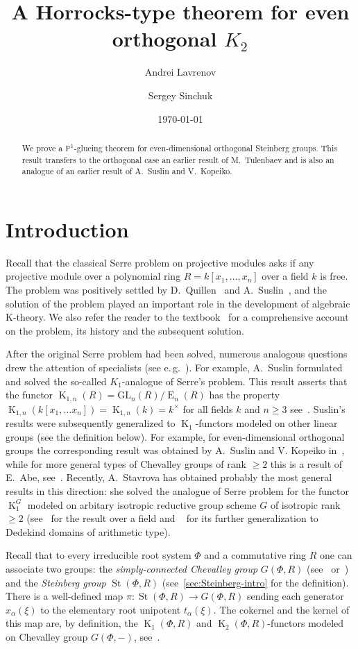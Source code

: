 \documentclass[oneside, 8pt]{amsart}
\title{A Horrocks-type theorem for even orthogonal $K_2$}
\author{Andrei Lavrenov}
\author {Sergey Sinchuk}
\date {\today}
\theoremstyle{remark}
\theoremstyle{definition}
\numberwithin{lemma}{section}
\numberwithin{prop}{section}
\numberwithin{corollary}{section}
\numberwithin{externaltheorem}{section}
\DeclareMathOperator{\St}{St}
\DeclareMathOperator{\E}{E}
\DeclareMathOperator{\K}{K}
\numberwithin{equation}{section}
\begin{document}
\begin{abstract} We prove a $\mathbb{P}^1$-glueing theorem for even-dimensional orthogonal Steinberg groups. This result transfers to the orthogonal case an earlier result of M.~Tulenbaev and is also an analogue of an earlier result of A.~Suslin and V.~Kopeiko. \end{abstract}
\maketitle
\section{Introduction}
Recall that the classical Serre problem on projective modules asks if any projective module over a polynomial ring $R = k[x_1,\ldots, x_n]$ over a field $k$ is free. The problem was positively settled by D.~Quillen~\cite{Qu76} and A.~Suslin~\cite{Su76}, and the solution of the problem played an important role in the development of algebraic K-theory. We also refer the reader to the textbook~\cite{Lam10} for a comprehensive account on the problem, its history and the subsequent solution.

After the original Serre problem had been solved, numerous analogous questions drew the attention of specialists (see e.\,g.~\cite{Su77, Su82, Abe83, Tu83, Lam10, St-poly, St-Ded}). For example, A.~Suslin formulated and solved the so-called $K_1$-analogue of Serre's problem. This result asserts that the functor $\K_{1,n}(R) = \mathrm{GL}_{n}(R)/\E_n(R)$ has the property $\K_{1,n}(k[x_1, \ldots x_n]) = \K_{1,n}(k) = k^\times$ for all fields $k$ and $n \geq 3$ see~\cite[Corollary~7.11]{Su77}. Suslin's results were subsequently generalized to $\K_1$-functors modeled on other linear groups (see the definition below). For example, for even-dimensional orthogonal groups the corresponding result was obtained by A.~Suslin and V. Kopeiko in~\cite{Su82}, while for more general types of Chevalley groups of rank $\geq 2$ this is a result of E.~Abe, see~\cite{Abe83}. Recently, A.~Stavrova has obtained probably the most general results in this direction: she solved the analogue of Serre problem for the functor $\K_1^G$ modeled on arbitary isotropic reductive group scheme $G$ of isotropic rank $\geq 2$ (see~\cite[Theorem~1.2]{St-poly} for the result over a field and ~\cite[Corollary~1.2]{St-Ded} for its further generalization to Dedekind domains of arithmetic type).

Recall that to every irreducible root system $\Phi$ and a commutative ring $R$ one can associate two groups: the {\it simply-connected Chevalley group} $G(\Phi, R)$ (see~\cite[\S~3]{St71} or~\cite{VP}) and the {\it Steinberg group} $\St(\Phi, R)$ (see~\cref{sec:Steinberg-intro} for the definition). There is a well-defined map $\pi \colon \St(\Phi, R) \to G(\Phi, R)$ sending each generator $x_\alpha(\xi)$ to the elementary root unipotent $t_\alpha(\xi)$. The cokernel and the kernel of this map are, by definition, the $\K_1(\Phi, R)$ and $\K_2(\Phi, R)$-functors modeled on Chevalley group $G(\Phi, -)$, see~\cite{St78}.
\end{document}

